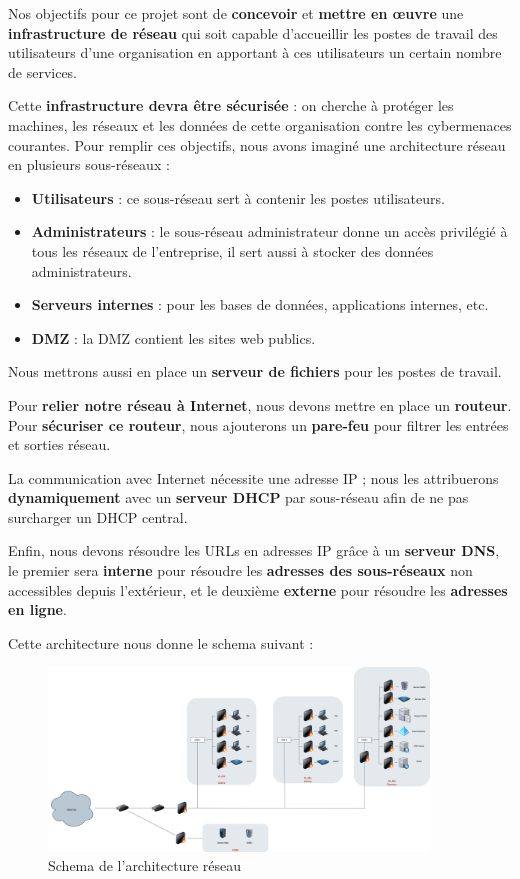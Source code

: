 \documentclass[../Livrable1.tex]{subfiles}
\begin{document}
Nos objectifs pour ce projet sont de \textbf{concevoir} et \textbf{mettre en œuvre} une \textbf{infrastructure de réseau} qui soit capable d’accueillir les postes de travail des utilisateurs d’une organisation en apportant à ces utilisateurs un certain nombre de services.

Cette \textbf{infrastructure devra être sécurisée} : on cherche à protéger les machines, les réseaux et les données de cette organisation contre les cybermenaces courantes.  
Pour remplir ces objectifs, nous avons imaginé une architecture réseau en plusieurs sous-réseaux :

\begin{itemize}
    \item \textbf{Utilisateurs} : ce sous-réseau sert à contenir les postes utilisateurs.
    \item \textbf{Administrateurs} : le sous-réseau administrateur donne un accès privilégié à tous les réseaux de l’entreprise, il sert aussi à stocker des données administrateurs.
    \item \textbf{Serveurs internes} : pour les bases de données, applications internes, etc.
    \item \textbf{DMZ} : la DMZ contient les sites web publics.
\end{itemize}

Nous mettrons aussi en place un \textbf{serveur de fichiers} pour les postes de travail.

Pour \textbf{relier notre réseau à Internet}, nous devons mettre en place un \textbf{routeur}. Pour \textbf{sécu\-ri\-ser ce routeur}, nous ajouterons un \textbf{pare-feu} pour filtrer les entrées et sorties réseau.

La communication avec Internet nécessite une adresse IP ; nous les attribuerons \textbf{dyna\-mi\-quement} avec un \textbf{serveur DHCP} par sous-réseau afin de ne pas surcharger un DHCP central.

Enfin, nous devons résoudre les URLs en adresses IP grâce à un \textbf{serveur DNS}, le premier sera \textbf{interne} pour résoudre les \textbf{adresses des sous-réseaux} non accessibles depuis l’extérieur, et le deuxième \textbf{externe} pour résoudre les \textbf{adresses en ligne}.

Cette architecture nous donne le schema suivant : 
\begin{figure}[h]
    \centering
    \includegraphics[width=0.9\textwidth]{../images/Architecture.jpg}
    \caption{Schema de l'architecture réseau}
    \label{fig:architecture}
\end{figure}
\end{document}
